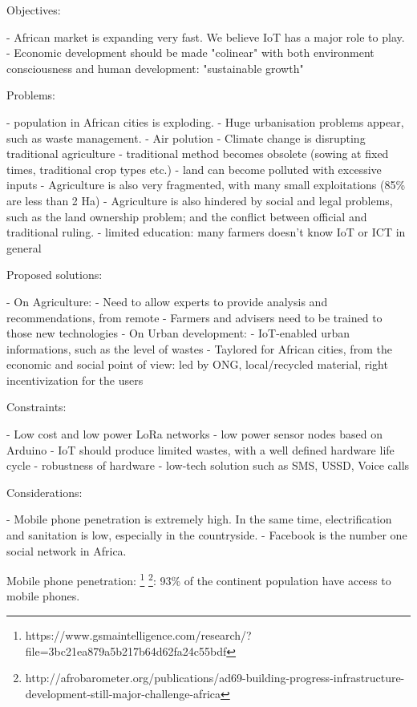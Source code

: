\documentclass[10pt, conference, compsocconf]{IEEEtran}
\newcommand {\0} {\mathbf 0}
\newcommand {\1} {\mathbf 1}
\begin{document}
\begin{markdown}
Objectives:

- African market is expanding very fast. We believe IoT has a major role to play.
- Economic development should be made "colinear" with both environment consciousness and human development: "sustainable growth"   

Problems: 

- population in African cities is exploding.
     - Huge urbanisation problems appear, such as waste management.
     - Air polution
- Climate change is disrupting traditional agriculture
     - traditional method becomes obsolete (sowing at fixed times, traditional crop types etc.)
     - land can become polluted with excessive inputs
     - Agriculture is also very fragmented, with many small exploitations (85\% are less than 2 Ha)
     - Agriculture is also hindered by social and legal problems, such as the land ownership problem; and the conflict between official and traditional ruling.
- limited education: many farmers doesn't know IoT or ICT in general

Proposed solutions:

- On Agriculture:
     - Need to allow experts to provide analysis and recommendations, from remote
     - Farmers and advisers need to be trained to those new technologies
- On Urban development:
     - IoT-enabled urban informations, such as the level of wastes
     - Taylored for African cities, from the economic and social point of view: led by ONG, local/recycled material, right incentivization for the users


Constraints:

- Low cost and low power LoRa networks
- low power sensor nodes based on Arduino
- IoT should produce limited wastes, with a well defined hardware life cycle
- robustness of hardware
- low-tech solution such as SMS, USSD, Voice calls

Considerations:

- Mobile phone penetration is extremely high. In the same time, electrification and sanitation is low, especially in the countryside.
- Facebook is the number one social network in Africa. 

     
\end{markdown}
Mobile phone penetration: \footnote{https://www.gsmaintelligence.com/research/?file=3bc21ea879a5b217b64d62fa24c55bdf} \footnote{http://afrobarometer.org/publications/ad69-building-progress-infrastructure-development-still-major-challenge-africa}: 93\% of the continent population have access to mobile phones.
\end{document}
